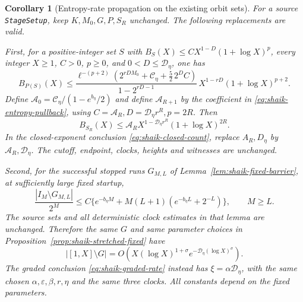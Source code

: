 \documentclass[11pt]{article}
\newtheorem{corollary}[proposition]{Corollary}
\theoremstyle{remark}\newtheorem{remark}[proposition]{Remark}
\begin{document}
\begin{corollary}[Entropy-rate propagation on the existing orbit sets]
\label{cor:shaik-entropy-propagation}
For a source \texttt{StageSetup}, keep \(K,M_0,G,P,S_R\) unchanged.
The following replacements are valid.

First, for a positive-integer set \(S\) with
\(B_S(X)\le C X^{1-D}(1+\log X)^p\), every integer \(X\ge1\),
\(C>0\), \(p\ge0\), and \(0<D\le\mathcal D_\eta\), one has
\begin{equation}\label{eq:shaik-entropy-pullback}
 B_{P(S)}(X)\le
 \frac{\ell^{-(p+2)}
  (2^{rDM_0}+\mathcal C_\eta+\frac52\,2^D C)}
 {1-2^{rD-1}}\,
 X^{1-rD}(1+\log X)^{p+2}.
\end{equation}
Define \(\mathcal A_0=\mathcal C_\eta/(1-e^{b_\eta}/2)\) and define
\(\mathcal A_{R+1}\) by the coefficient in
\eqref{eq:shaik-entropy-pullback}, using
\(C=\mathcal A_R,D=\mathcal D_\eta r^R,p=2R\).
Then
\begin{equation}\label{eq:shaik-entropy-iterate}
 B_{S_R}(X)\le
 \mathcal A_R X^{1-\mathcal D_\eta r^R}(1+\log X)^{2R}.
\end{equation}
In the closed-exponent conclusion
\eqref{eq:shaik-closed-count}, replace
\(A_R,D_\eta\) by \(\mathcal A_R,\mathcal D_\eta\).
The cutoff, endpoint, clocks, heights and witnesses are unchanged.

Second, for the successful stopped runs \(G_{M,L}\) of
Lemma~\ref{lem:shaik-fixed-barrier}, at sufficiently large fixed startup,
\begin{equation}\label{eq:shaik-entropy-fixed-failure}
 \frac{|I_M\setminus G_{M,L}|}{2^M}
 \le C\{e^{-b_\eta M}
       +M(L+1)(e^{-b_\eta L}+2^{-L})\},
 \qquad M\ge L.
\end{equation}
The source sets and all deterministic clock estimates in that lemma
are unchanged. Therefore the same \(G\) and same parameter choices
in Proposition~\ref{prop:shaik-stretched-fixed} have
\begin{equation}\label{eq:shaik-entropy-stretched}
 |[1,X]\setminus G|
 =O\!\left(X(\log X)^{1+\sigma}
      e^{-\mathcal D_\eta(\log X)^\sigma}\right).
\end{equation}
The graded conclusion \eqref{eq:shaik-graded-rate} instead has
\(\xi=\alpha\mathcal D_\eta\), with the same chosen
\(\alpha,\varepsilon,\beta,r,\eta\) and the same three clocks.
All constants depend on the fixed parameters.
\end{corollary}
\end{document}
